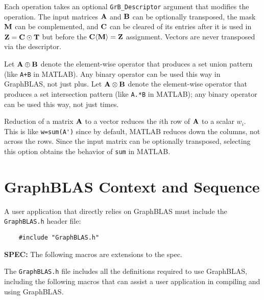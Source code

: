 \documentclass[12pt]{article}
\begin{document}
Each operation takes an optional \verb'GrB_Descriptor' argument that modifies
the operation.  The input matrices ${\bf A}$ and ${\bf B}$ can be optionally
transposed, the mask ${\bf M}$ can be complemented, and ${\bf C}$ can be
cleared of its entries after it is used in ${\bf Z = C \odot T}$ but before
the ${\bf C \langle M \rangle = Z}$ assignment.
Vectors are never transposed via the descriptor.

Let ${\bf A \oplus B}$ denote the element-wise operator that produces a set
union pattern (like \verb'A+B' in MATLAB).  Any binary operator can be used
this way in GraphBLAS, not just plus.  Let ${\bf A \otimes B}$ denote the
element-wise operator that produces a set intersection pattern (like
\verb'A.*B' in MATLAB); any binary operator can be used this way, not just
times.

Reduction of a matrix ${\bf A}$ to a vector reduces the $i$th row of ${\bf A}$
to a scalar $w_i$.  This is like \verb"w=sum(A')" since by default, MATLAB
reduces down the columns, not across the rows.  Since the input matrix can be
optionally transposed, selecting this option obtains the behavior of \verb'sum'
in MATLAB.




\newpage
\section{GraphBLAS Context and Sequence} %
\label{context}

A user application that directly relies on GraphBLAS must include the
\verb'GraphBLAS.h' header file:

\begin{mdframed}[userdefinedwidth=6in]
{\footnotesize
\begin{verbatim}
    #include "GraphBLAS.h"
\end{verbatim}
} \end{mdframed}

\begin{spec}
{\bf SPEC:} The following macros are extensions to the spec.
\end{spec}

The \verb'GraphBLAS.h' file includes all the definitions required to use
GraphBLAS, including the following macros that can assist a user application in
compiling and using GraphBLAS.
\end{document}

